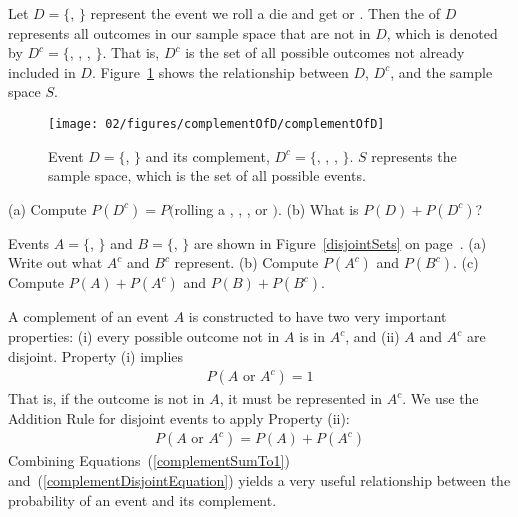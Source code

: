 Let $D=\{$, $\}$ represent the event we roll a die and get  or . Then the  of $D$ represents all outcomes in our sample space that are not in $D$, which is denoted by $D^c = \{$, , , $\}$. That is, $D^c$ is the set of all possible outcomes not already included in $D$. Figure~\ref{complementOfD} shows the relationship between $D$, $D^c$, and the sample space $S$. 
\begin{figure}[hht]
\centering
\texttt{[image: 02/figures/complementOfD/complementOfD]}
\caption{Event $D=\{$, $\}$ and its complement, $D^c = \{$, , , $\}$. $S$ represents the sample space, which is the set of all possible events.}
\label{complementOfD}
\end{figure}

\begin{exercise}
(a) Compute $P(D^c) = P($rolling a , , , or $)$. (b) What is $P(D) + P(D^c)$?
\end{exercise}

\begin{exercise}
Events $A=\{$, $\}$ and $B=\{$, $\}$ are shown in Figure~\ref{disjointSets} on page~\pageref{disjointSets}. (a) Write out what $A^c$ and $B^c$ represent. (b) Compute $P(A^c)$ and $P(B^c)$. (c) Compute $P(A)+P(A^c)$ and $P(B)+P(B^c)$.
\end{exercise}

A complement of an event $A$ is constructed to have two very important properties: (i) every possible outcome not in $A$ is in $A^c$, and (ii) $A$ and $A^c$ are disjoint. Property (i) implies
\begin{eqnarray}
P(A\text{ or }A^c) = 1
\label{complementSumTo1}
\end{eqnarray}
That is, if the outcome is not in $A$, it must be represented in $A^c$. We use the Addition Rule for disjoint events to apply Property (ii):
\begin{eqnarray}
P(A\text{ or }A^c) = P(A) + P(A^c)
\label{complementDisjointEquation}
\end{eqnarray}
Combining Equations~(\ref{complementSumTo1}) and~(\ref{complementDisjointEquation}) yields a very useful relationship between the probability of an event and its complement.

